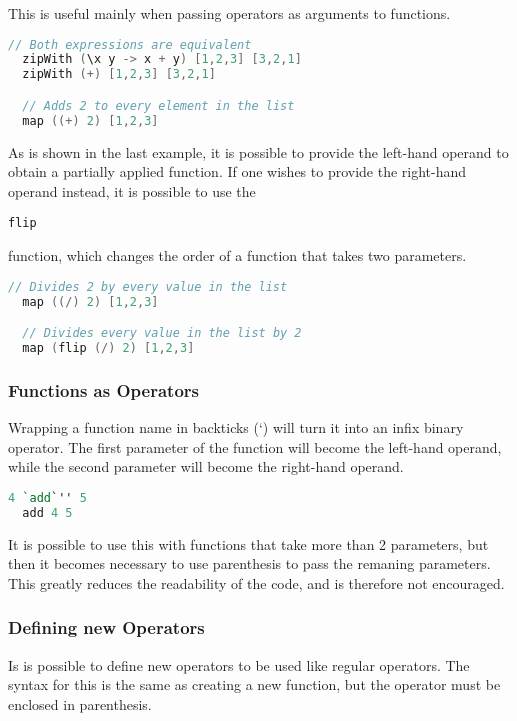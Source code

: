 \documentclass{article}
\def\code#1{\begin{footnotesize}\texttt{#1}\end{footnotesize}}
\begin{document}
This is useful mainly when passing operators as arguments to functions.

\begin{lstlisting}[language=V]
  // Both expressions are equivalent
  zipWith (\x y -> x + y) [1,2,3] [3,2,1]
  zipWith (+) [1,2,3] [3,2,1]

  // Adds 2 to every element in the list
  map ((+) 2) [1,2,3]
\end{lstlisting}

As is shown in the last example, it is possible to provide the left-hand operand to obtain a partially applied function.
If one wishes to provide the right-hand operand instead, it is possible to use the \code{flip} function, which changes the order of a function that takes two parameters.

\begin{lstlisting}[language=V]
  // Divides 2 by every value in the list
  map ((/) 2) [1,2,3]

  // Divides every value in the list by 2
  map (flip (/) 2) [1,2,3]
\end{lstlisting}

\subsubsection{Functions as Operators}

Wrapping a function name in backticks (\lq) will turn it into an infix binary operator.
The first parameter of the function will become the left-hand operand, while the second parameter will become the right-hand operand.

\begin{lstlisting}[language=V, escapechar=']
  4 `add`'' 5
  add 4 5
\end{lstlisting}

It is possible to use this with functions that take more than 2 parameters, but then it becomes necessary to use parenthesis to pass the remaning parameters.
This greatly reduces the readability of the code, and is therefore not encouraged.

\subsubsection{Defining new Operators}

Is is possible to define new operators to be used like regular operators.
The syntax for this is the same as creating a new function, but the operator must be enclosed in parenthesis.
\end{document}
